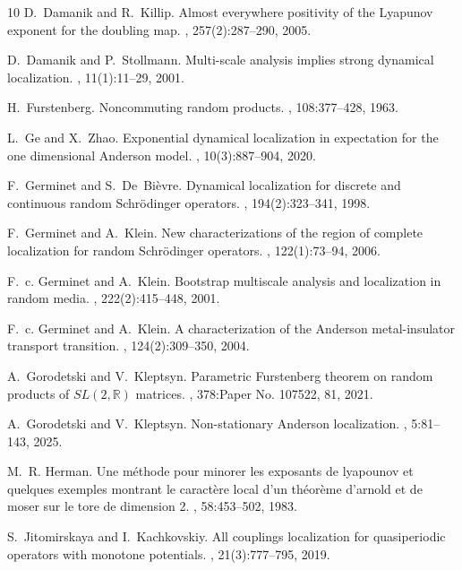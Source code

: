 \documentclass{amsart}
\newcommand{\RR}{\mathbb{R}}
\begin{document}
\begin{thebibliography}{10}
D.~Damanik and R.~Killip.
\newblock Almost everywhere positivity of the {L}yapunov exponent for the doubling map.
, 257(2):287--290, 2005.

D.~Damanik and P.~Stollmann.
\newblock Multi-scale analysis implies strong dynamical localization.
, 11(1):11--29, 2001.

H.~Furstenberg.
\newblock Noncommuting random products.
, 108:377--428, 1963.

L.~Ge and X.~Zhao.
\newblock Exponential dynamical localization in expectation for the one dimensional {A}nderson model.
, 10(3):887--904, 2020.

F.~Germinet and S.~De~Bi\`evre.
\newblock Dynamical localization for discrete and continuous random {S}chr\"odinger operators.
, 194(2):323--341, 1998.

F.~Germinet and A.~Klein.
\newblock New characterizations of the region of complete localization for random {S}chr\"odinger operators.
, 122(1):73--94, 2006.

F.~c. Germinet and A.~Klein.
\newblock Bootstrap multiscale analysis and localization in random media.
, 222(2):415--448, 2001.

F.~c. Germinet and A.~Klein.
\newblock A characterization of the {A}nderson metal-insulator transport transition.
, 124(2):309--350, 2004.

A.~Gorodetski and V.~Kleptsyn.
\newblock Parametric {F}urstenberg theorem on random products of {$SL(2,\RR)$} matrices.
, 378:Paper No. 107522, 81, 2021.

A.~Gorodetski and V.~Kleptsyn.
\newblock Non-stationary {A}nderson localization.
, 5:81--143, 2025.

M.~R. Herman.
\newblock Une méthode pour minorer les exposants de lyapounov et quelques exemples montrant le caractère local d'un théorème d'arnold et de moser sur le tore de dimension 2.
, 58:453--502, 1983.

S.~Jitomirskaya and I.~Kachkovskiy.
\newblock All couplings localization for quasiperiodic operators with monotone potentials.
, 21(3):777--795, 2019.


\end{thebibliography}
\end{document}

